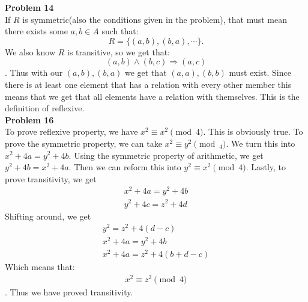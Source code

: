 \documentclass[12pt]{article}
\begin{document}
\noindent
\textbf{Problem 14}\\
If $R$ is symmetric(also the conditions given in the problem), 
that must mean there exists some $a,b \in A$ such that:
 \[
	 R = \{(a,b), (b,a), \cdots\}
.\] We also know $R$ is transitive, so we get that: 
$$(a, b) \land (b,c) \Rightarrow (a,c)$$. 
Thus with our $(a,b), (b,a)$ we get that $(a,a),(b,b)$ must exist.
Since there is at least one element that has a relation with every other member
this means that we get that all elements have a relation with themselves. This 
is the definition of reflexive.\\
\noindent
\textbf{Problem 16}\\
To prove reflexive property, we have $x^2 \equiv x^2 \pmod{4}$. This is obviously true. 
To prove the symmetric property, we can take $x^2 \equiv y^2 \pmod_4$. We turn this into
$x^2 + 4a = y^2 + 4b$. Using the symmetric property of arithmetic, we get $y^2 + 4b=x^2+4a$.
Then we can reform this into $y^2 \equiv x^2 \pmod4$. Lastly, to prove transitivity, we get 
\begin{align}
	x^2 + 4a = y^2 + 4b \\
	y^2 + 4c = z^2 + 4d
\end{align}
Shifting around, we get 
\begin{align}
	y^2 = z^2+4(d-c) \\
	
	x^2 + 4a = y^2 + 4b \\
	
	x^2 + 4a = z^2 + 4(b+d-c) 
\end{align}
Which means that:
\begin{align}
	x^2 \equiv z^2 \pmod{4}
\end{align}.
Thus we have proved transitivity. 
\end{document}
